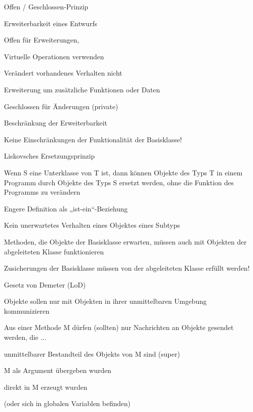 \documentclass[a4paper]{article}
\begin{document}
\begin{multicols}{3}
  Offen / Geschlossen-Prinzip
  \begin{itemize*}
    \item Erweiterbarkeit eines Entwurfs
    \item Offen für Erweiterungen,
    \begin{itemize*}
      \item Virtuelle Operationen verwenden
      \item Verändert vorhandenes Verhalten nicht
      \item Erweiterung um zusätzliche Funktionen oder Daten
    \end{itemize*}
    \item Geschlossen für Änderungen (private)
    \item Beschränkung der Erweiterbarkeit
    \begin{itemize*}
      \item Keine Einschränkungen der Funktionalität der Basisklasse!
    \end{itemize*}
  \end{itemize*}

  Liskovsches Ersetzungsprinzip
  \begin{itemize*}
    \item Wenn S eine Unterklasse von T ist, dann können Objekte des Typs T in einem Programm durch Objekte des Typs S ersetzt werden, ohne die Funktion des Programms zu verändern
    \item Engere Definition als „ist-ein“-Beziehung
    \item Kein unerwartetes Verhalten eines Objektes eines Subtyps
    \item Methoden, die Objekte der Basisklasse erwarten, müssen auch mit Objekten der abgeleiteten Klasse funktionieren
    \item Zusicherungen der Basisklasse müssen von der abgeleiteten Klasse erfüllt werden!
  \end{itemize*}

  Gesetz von Demeter (LoD)
  \begin{itemize*}
    \item Objekte sollen nur mit Objekten in ihrer unmittelbaren Umgebung kommunizieren
    \item Aus einer Methode M dürfen (sollten) nur Nachrichten an Objekte gesendet werden, die ...
    \begin{itemize*}
      \item unmittelbarer Bestandteil des Objekts von M sind (super)
      \item M als Argument übergeben wurden
      \item direkt in M erzeugt wurden
      \item (oder sich in globalen Variablen befinden)
    \end{itemize*}
  \end{itemize*}


\end{multicols}
\end{document}
